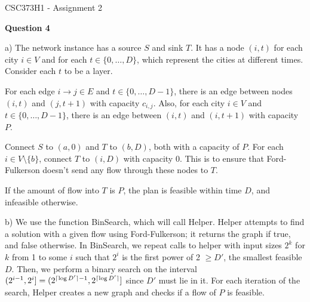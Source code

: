 \documentclass[11pt]{article}
\DeclarePairedDelimiter{\ceil}{\lceil}{\rceil}
\begin{document}
\begin{center}
    {\Large CSC373H1 - Assignment 2}
\end{center}

\textbf{Question 4}

a) The network instance has a source $S$ and sink $T$. It has a node $(i,t)$ for each city $i\in V$ and for each $t\in \{0,\ldots,D\}$, which represent the cities at different times. Consider each $t$ to be a layer.

For each edge $i\to j \in E$ and $t\in \{0,\ldots,D-1\}$, there is an edge between nodes $(i,t)$ and $(j,t+1)$ with capacity $c_{i,j}$. Also, for each city $i\in V$ and $t\in \{0,\ldots,D-1\}$, there is an edge between $(i,t)$ and $(i,t+1)$ with capacity $P$.

Connect $S$ to $(a,0)$ and $T$ to $(b,D)$, both with a capacity of $P$. For each $i\in V\setminus\{b\}$, connect $T$ to $(i,D)$ with capacity 0. This is to ensure that Ford-Fulkerson doesn't send any flow through these nodes to $T$.

If the amount of flow into $T$ is $P$, the plan is feasible within time $D$, and infeasible otherwise.

b) We use the function BinSearch, which will call Helper. Helper attempts to find a solution with a given flow using Ford-Fulkerson; it returns the graph if true, and false otherwise. In BinSearch, we repeat calls to helper with input sizes $2^k$ for $k$ from 1 to some $i$ such that $2^i$ is the first power of 2 $\geq D'$, the smallest feasible $D$. Then, we perform a binary search on the interval $(2^{i-1},2^i]=(2^{\ceil{\log D'}-1}, 2^{\ceil{\log D'}}]$ since $D'$ must lie in it. For each iteration of the search, Helper creates a new graph and checks if a flow of $P$ is feasible.


\end{document}
